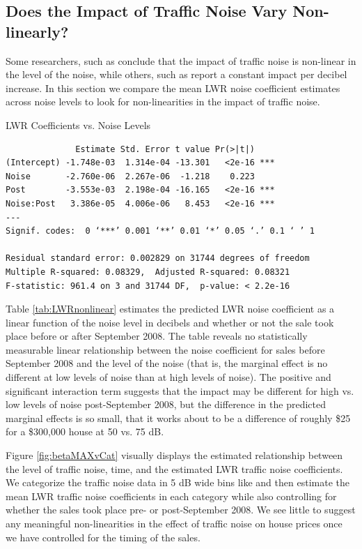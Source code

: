 \documentclass{article}\usepackage{graphicx, color}
\begin{document}
\subsection{Does the Impact of Traffic Noise Vary Non-linearly?}

Some researchers, such as \citet{Theebe2004a} conclude that the impact of traffic noise is non-linear in the level of the noise, while others, such as \citet{Huang;Palmquist2001} report a constant impact per decibel increase. In this section we compare the mean LWR noise coefficient estimates across noise levels to look for non-linearities in the impact of traffic noise.

\begin{table}
\caption{LWR Coefficients vs. Noise Levels}\label{tab:LWRnonlinear}
\begin{verbatim}
              Estimate Std. Error t value Pr(>|t|)    
(Intercept) -1.748e-03  1.314e-04 -13.301   <2e-16 ***
Noise       -2.760e-06  2.267e-06  -1.218    0.223    
Post        -3.553e-03  2.198e-04 -16.165   <2e-16 ***
Noise:Post   3.386e-05  4.006e-06   8.453   <2e-16 ***
---
Signif. codes:  0 ‘***’ 0.001 ‘**’ 0.01 ‘*’ 0.05 ‘.’ 0.1 ‘ ’ 1 

Residual standard error: 0.002829 on 31744 degrees of freedom
Multiple R-squared: 0.08329,  Adjusted R-squared: 0.08321 
F-statistic: 961.4 on 3 and 31744 DF,  p-value: < 2.2e-16 
\end{verbatim}
\end{table}

Table \ref{tab:LWRnonlinear} estimates the predicted LWR noise coefficient as a linear function of the noise level in decibels and whether or not the sale took place before or after September 2008. The table reveals no statistically measurable linear relationship between the noise coefficient for sales before September 2008 and the level of the noise (that is, the marginal effect is no different at low levels of noise than at high levels of noise). The positive and significant interaction term suggests that the impact may be different for high vs. low levels of noise post-September 2008, but the difference in the predicted marginal effects is so small, that it works about to be a difference of roughly \$25 for a \$300,000 house at 50 vs. 75 dB. 

Figure \ref{fig:betaMAXvCat} visually displays the estimated relationship between the level of traffic noise, time, and the estimated LWR traffic noise coefficients. We categorize the traffic noise data in 5 dB wide bins like \citet{Theebe2004a} and then estimate the mean LWR traffic noise coefficients in each category while also controlling for whether the sales took place pre- or post-September 2008. We see little to suggest any meaningful non-linearities in the effect of traffic noise on house prices once we have controlled for the timing of the sales.
\end{document}
